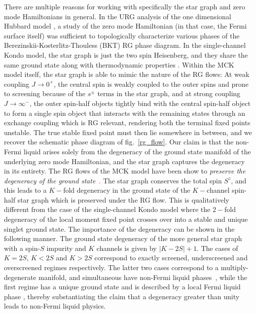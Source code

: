 \documentclass[reprint,prb,superscriptaddress]{revtex4-2}
\begin{document}
There are multiple reasons for working with specifically the star graph and zero mode Hamiltonians in general. In the URG analysis of the one dimensional Hubbard model \cite{1dhubjhep}, a study of the zero mode Hamiltonian (in that case, the Fermi surface itself) was sufficient to topologically characterize various phases of the Berezinskii-Kosterlitz-Thouless (BKT) RG phase diagram. In the single-channel Kondo model, the star graph is just the two spin Heisenberg, and they share the same ground state \cite{varma_yafet_1976,yosida_1966,wilson1975renormalization} along with thermodynamic properties \cite{varma_yafet_1976,kondo_urg}. Within the MCK model itself, the star graph is able to mimic the nature of the RG flows: At weak coupling \(J \to 0^+\), the central spin is weakly coupled to the outer spins and  prone to screening because of the \(s^\pm\) terms in the star graph, and at strong coupling \(J \to \infty^-\), the outer spin-half objects tightly bind with the central spin-half object to form a single spin object that interacts with the remaining states through an exchange coupling which is RG relevant, rendering both the terminal fixed points unstable. The true stable fixed point must then lie somewhere in between, and we recover the schematic phase diagram of fig.~\ref{rg_flow}. Our claim is that the non-Fermi liquid arises solely from the degeneracy of the ground state manifold of the underlying zero mode Hamiltonian, and the star graph captures the degeneracy in its entirety. The RG flows of the MCK model have been show to \textit{preserve the degeneracy of the ground state}~\cite{pang_cox_1991,kroha_kolf_2007,zitko_fabrizio_2017}\textcolor{red}. The star graph conserves the total spin \(S^z\), and this leads to a \(K-\)fold degeneracy in the ground state of the \(K-\)channel spin-half star graph which is preserved under the RG flow. This is qualitatively different from the case of the single-channel Kondo model where the \(2-\)fold degeneracy of the local moment fixed point crosses over into a stable and unique singlet ground state. The importance of the degeneracy can be shown in the following manner. The ground state degeneracy of the more general star graph with a spin-\(S\) impurity and \(K\) channels is given by \(|K - 2S|+1\). The cases of \(K=2S\), \(K<2S\) and \(K>2S\) correspond to exactly screened, underscreened and overscreened regimes respectively. The latter two cases correspond to a multiply-degenerate manifold, and simultaneous have non-Fermi liquid phases~\cite{Noz_blandin_1980,Gan_Andrei_Coleman_1993,emery_kivelson,Gan_mchannel_1994,Tsvelick_Weigmann_mchannel_1984,Tsvelick_weigmann_mchannel_1985,parcollet_olivier_large_N,kimura_taro_Su_N_kondo,PhysRevB.73.224445,cox_jarrell_two_channel_rev,affleck_1991_overscreen,Coleman_tsvelik,affleck1993exact,coleman_pepin_2003,roch_nicolas_costi_2009,schiller_avraham_2008,Durganandini_2011}, while the first regime has a unique ground state and is described by a local Fermi liquid phase \cite{wilson1975,nozieres1974fermi,Noz_blandin_1980,andreiKondoreview,tsvelickKondoreview}, thereby substantiating the claim that a degeneracy greater than unity leads to non-Fermi liquid physics.
\end{document}
